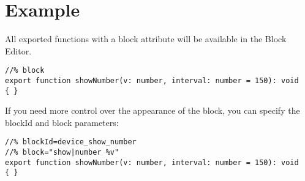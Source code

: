 \section{Example}

All exported functions with a block attribute will be available in the Block Editor.

\begin{lstlisting}
//% block
export function showNumber(v: number, interval: number = 150): void
{ }
\end{lstlisting}
If you need more control over the appearance of the block, you can specify the 
blockId and block parameters:
\begin{lstlisting}
//% blockId=device_show_number
//% block="show|number %v"
export function showNumber(v: number, interval: number = 150): void
{ }
\end{lstlisting}
